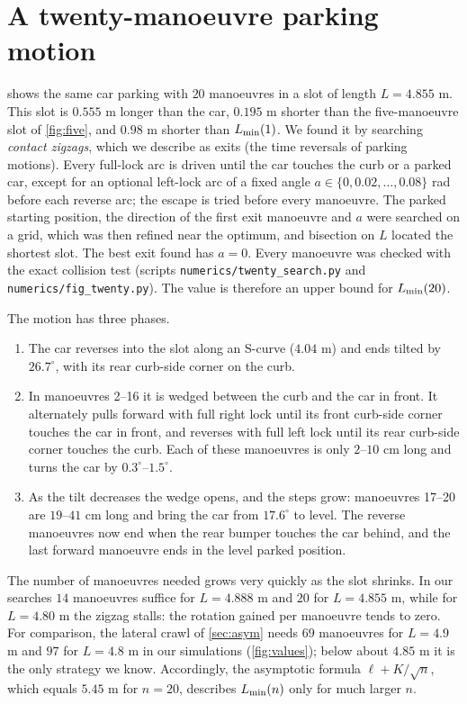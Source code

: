\section{A twenty-manoeuvre parking motion}\label{app:twenty}

 shows the same car parking with $20$ manoeuvres in a slot of length $L=4.855$ m.
This slot is $0.555$ m longer than the car, $0.195$ m shorter than the five-manoeuvre slot of \cref{fig:five}, and $0.98$ m shorter than $L_{\min}(1)$.
We found it by searching \emph{contact zigzags}, which we describe as exits (the time reversals of parking motions).
Every full-lock arc is driven until the car touches the curb or a parked car, except for an optional left-lock arc of a fixed angle $a\in\{0,0.02,\dots,0.08\}$ rad before each reverse arc; the escape is tried before every manoeuvre.
The parked starting position, the direction of the first exit manoeuvre and $a$ were searched on a grid, which was then refined near the optimum, and bisection on $L$ located the shortest slot.
The best exit found has $a=0$.
Every manoeuvre was checked with the exact collision test (scripts \texttt{numerics/twenty\_search.py} and \texttt{numerics/fig\_twenty.py}).
The value is therefore an upper bound for $L_{\min}(20)$.

The motion has three phases.
\begin{enumerate}[nosep]
\item The car reverses into the slot along an S-curve ($4.04$ m) and ends tilted by $26.7^\circ$, with its rear curb-side corner on the curb.
\item In manoeuvres 2--16 it is wedged between the curb and the car in front.
It alternately pulls forward with full right lock until its front curb-side corner touches the car in front, and reverses with full left lock until its rear curb-side corner touches the curb.
Each of these manoeuvres is only $2$--$10$ cm long and turns the car by $0.3^\circ$--$1.5^\circ$.
\item As the tilt decreases the wedge opens, and the steps grow: manoeuvres 17--20 are $19$--$41$ cm long and bring the car from $17.6^\circ$ to level. The reverse manoeuvres now end when the rear bumper touches the car behind, and the last forward manoeuvre ends in the level parked position.
\end{enumerate}
The number of manoeuvres needed grows very quickly as the slot shrinks.
In our searches $14$ manoeuvres suffice for $L=4.888$ m and $20$ for $L=4.855$ m, while for $L=4.80$ m the zigzag stalls: the rotation gained per manoeuvre tends to zero.
For comparison, the lateral crawl of \cref{sec:asym} needs $69$ manoeuvres for $L=4.9$ m and $97$ for $L=4.8$ m in our simulations (\cref{fig:values}); below about $4.85$ m it is the only strategy we know.
Accordingly, the asymptotic formula $\ell+K/\sqrt{n}$, which equals $5.45$ m for $n=20$, describes $L_{\min}(n)$ only for much larger $n$.

